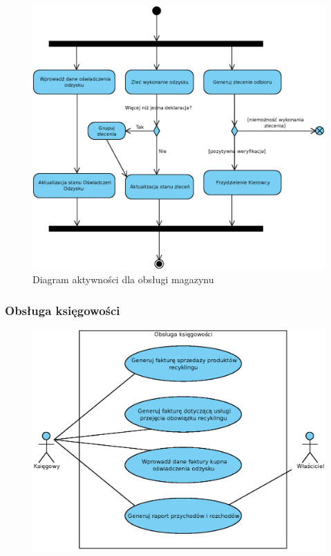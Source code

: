 	\begin{figure}[H]
		\centering
		\includegraphics[width=.9\textwidth]{img/AD/skup.eps}
		\caption{Diagram aktywności dla obsługi magazynu}
	\end{figure}

\subsubsection{Obsługa księgowości}
	\begin{figure}[H]
		\centering
		\includegraphics[width=\textwidth]{img/UC/ksiegowosc.eps}
	\end{figure}

